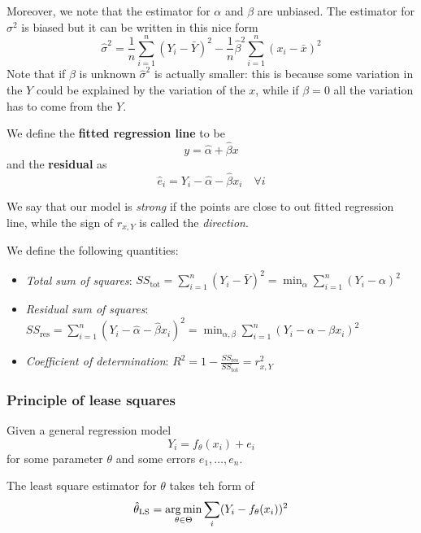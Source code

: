 \documentclass[12pt]{extarticle}
\begin{document}
Moreover, we note that the estimator for $\alpha$ and $\beta$ are unbiased.
The estimator for $\sigma^2$ is biased but it can be written in this nice form
\begin{equation}
    \hat \sigma^2 = \frac{1}{n}\sum_{i = 1}^n (Y_i - \bar Y)^2 - \frac{1}{n} \hat \beta^2 \sum_{i = 1}^n (x_i - \bar x)^2
\end{equation}
Note that if $\beta$ is unknown $\hat \sigma^2$ is actually smaller:
this is because some variation in the $Y$ could be explained by the variation of the $x$,
while if $\beta = 0$ all the variation has to come from the $Y$.

We define the \textbf{fitted regression line} to be
\begin{equation}
    y = \hat \alpha + \hat \beta x
\end{equation}
and the \textbf{residual} as
\begin{equation}
    \hat e_i = Y_i - \hat \alpha - \hat \beta x_i \quad \forall i
\end{equation}

We say that our model is \emph{strong} if the points are close to out fitted regression line,
while the sign of $r_{x, Y}$ is called the \emph{direction}.

We define the following quantities:
\begin{itemize}
    \item \emph{Total sum of squares}: $SS_\text{tot} = \sum_{i = 1}^n (Y_i - \bar Y)^2 = \min_\alpha \sum_{i = 1}^n (Y_i - \alpha)^2$
    \item \emph{Residual sum of squares}: $SS_\text{res} = \sum_{i = 1}^n (Y_i - \hat \alpha - \hat \beta x_i)^2 = \min_{\alpha, \beta} \sum_{i = 1}^n (Y_i - \alpha - \beta x_i)^2$
    \item \emph{Coefficient of determination}: $R^2 = 1 - \frac{SS_\text{res}}{SS_\text{tot}} = r^2_{x, Y}$
\end{itemize}

\subsubsection{Principle of lease squares}
Given a general regression model
\begin{equation}
    Y_i = f_\theta(x_i) + e_i
\end{equation}
for some parameter $\theta$ and some errors $e_1, \dots, e_n$.

The least square estimator for $\theta$ takes teh form of
\begin{equation}
    \hat \theta_\text{LS} = \operatorname*{arg\,min}_{\theta \in \Theta} \sum_{i}(Y_i - f_\theta(x_i))^2
\end{equation}
\end{document}
